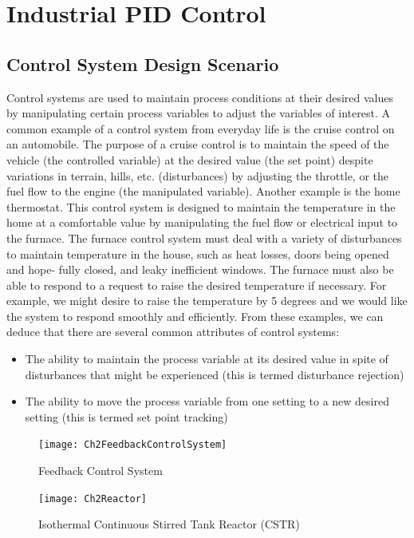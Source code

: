 \chapter{Industrial PID Control}
\label{chap:IndustrialPID}


\section{Control System Design Scenario}
\label{sec:1}

Control systems are used to maintain process conditions at their desired values by manipulating certain process variables to adjust the variables of interest. A common example of a control system from everyday life is the cruise control on an automobile. The purpose of a cruise control is to maintain the speed of the vehicle (the controlled variable) at the desired value (the set point) despite variations in terrain, hills, etc. (disturbances) by adjusting the throttle, or the fuel flow to the engine (the manipulated variable). Another example is the home thermostat. This control system is designed to maintain the temperature in the home at a comfortable value by manipulating the fuel flow or electrical input to the furnace. The furnace control system must deal with a variety of disturbances to maintain temperature in the house, such as heat losses, doors being opened and hope- fully closed, and leaky inefficient windows. The furnace must also be able to respond to a request to raise the desired temperature if necessary. For example, we might desire to raise the temperature by 5 degrees and we would like the system to respond smoothly and efficiently. From these examples, we can deduce that there are several common attributes of control systems:
\begin{itemize}
\item The ability to maintain the process variable at its desired value in spite of disturbances that might be experienced (this is termed disturbance rejection)
\item The ability to move the process variable from one setting to a new desired setting (this is termed set point tracking)
\end{itemize}
%
\begin{figure}[tb]
\centering
\texttt{[image: Ch2FeedbackControlSystem]}
\caption{Feedback Control System} \label{Ch2fig:FeedbackControlSystem}
\end{figure}
%
\begin{figure}[tb]
\centering
\texttt{[image: Ch2Reactor]}
\caption{Isothermal Continuous Stirred Tank Reactor (CSTR)} 
\label{Ch2fig:CSTR}
\end{figure}

